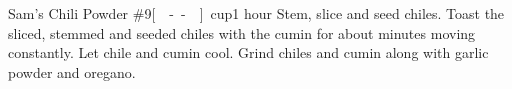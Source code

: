 \begin{recipe}{Sam's Chili Powder \#9}{\unit[--]{cup}}{1 hour}
Stem, slice and seed chiles.
Toast the sliced, stemmed and seeded chiles with the cumin for about \unit[3--4]{minutes} moving constantly.  Let chile and cumin cool.
Grind chiles and cumin along with garlic powder and oregano.
\end{recipe}
